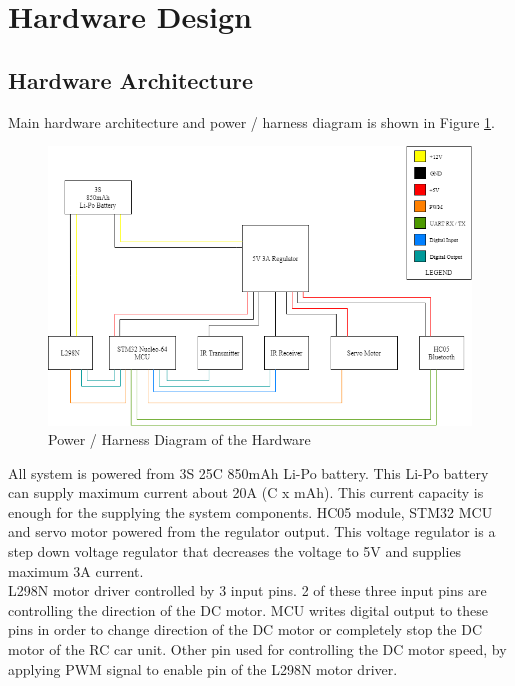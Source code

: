 \section{Hardware Design} \label{sec_hardware_design}

\subsection{Hardware Architecture} \label{sec_hardware_architecture}

Main hardware architecture and power / harness diagram is shown in Figure \ref{fig:hardware_architecture}. 

\begin{figure}[!htbp]
    \centering
    \includegraphics[width=1\textwidth]{Imgs/ana_devre_v3.png}
    \caption{\label{fig:hardware_architecture}Power / Harness Diagram of the Hardware}
\end{figure}

All system is powered from 3S 25C 850mAh Li-Po battery. This Li-Po battery can supply maximum current about 20A (C x mAh). This current capacity is enough for the supplying the system components. HC05 module, STM32 MCU and servo motor powered from the regulator output. This voltage regulator is a step down voltage regulator that decreases the voltage to 5V and supplies maximum 3A current.\\

L298N motor driver controlled by 3 input pins. 2 of these three input pins are controlling the direction of the DC motor. MCU writes digital output to these pins in order to change direction of the DC motor or completely stop the DC motor of the RC car unit. Other pin used for controlling the DC motor speed, by applying PWM signal to enable pin of the L298N motor driver. \\

